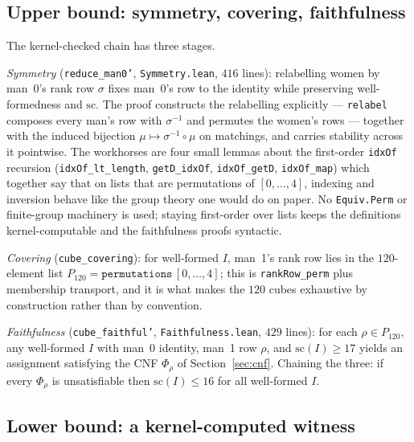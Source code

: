 \documentclass[11pt]{article}
\begin{document}
\subsection{Upper bound: symmetry, covering, faithfulness}

The kernel-checked chain has three stages.

\emph{Symmetry} (\texttt{reduce\_man0'}, \texttt{Symmetry.lean}, $416$ lines): relabelling
women by man~0's rank row $\sigma$ fixes man~0's row to the identity while preserving
well-formedness and $\mathrm{sc}$. The proof constructs the relabelling explicitly ---
\texttt{relabel} composes every man's row with $\sigma^{-1}$ and permutes the women's rows
--- together with the induced bijection $\mu \mapsto \sigma^{-1}\circ\mu$ on matchings, and
carries stability across it pointwise. The workhorses are four small lemmas about the
first-order \texttt{idxOf} recursion (\texttt{idxOf\_lt\_length}, \texttt{getD\_idxOf},
\texttt{idxOf\_getD}, \texttt{idxOf\_map}) which together say that on lists that are
permutations of $[0,\dots,4]$, indexing and inversion behave like the group theory one
would do on paper. No \texttt{Equiv.Perm} or finite-group machinery is used; staying
first-order over lists keeps the definitions kernel-computable and the faithfulness proofs
syntactic.

\emph{Covering} (\texttt{cube\_covering}): for well-formed $I$, man~1's rank row lies in
the $120$-element list $P_{120} = \texttt{permutations}\,[0,\dots,4]$; this is
\texttt{rankRow\_perm} plus membership transport, and it is what makes the $120$ cubes
exhaustive by construction rather than by convention.

\emph{Faithfulness} (\texttt{cube\_faithful'}, \texttt{Faithfulness.lean}, $429$ lines):
for each $\rho \in P_{120}$, any well-formed $I$ with man~0 identity, man~1 row $\rho$, and
$\mathrm{sc}(I) \ge 17$ yields an assignment satisfying the CNF $\Phi_\rho$ of
Section~\ref{sec:cnf}. Chaining the three: if every $\Phi_\rho$ is unsatisfiable then
$\mathrm{sc}(I) \le 16$ for all well-formed $I$.

\subsection{Lower bound: a kernel-computed witness}
\end{document}
